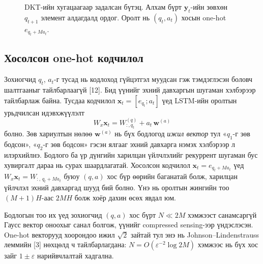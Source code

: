 \documentclass[10pt,twocolumn]{article}
\newcommand{\x}{\mathbf{x}}
\newcommand{\h}{\mathbf{h}}
\newcommand{\y}{\mathbf{y}}
\begin{document}
\begin{figure}[t]
\centering
{}
\caption{DKT-ийн хугацаагаар задалсан бүтэц. Алхам бүрт $\y_t$-ийн зөвхөн $q_{t+1}$
элемент алдагдалд ордог. Оролт нь $(q_t,a_t)$ хосын one-hot $e_{q_t+Ma_t}$.}
\label{fig:dkt}
\end{figure}

\subsection{Хосолсон one-hot кодчилол}
Зохиогчид $q_t$, $a_t$-г тусад нь кодлоход гүйцэтгэл муудсан гэж тэмдэглэсэн боловч шалтгааныг
тайлбарлаагүй [12]. Бид үүнийг эхний давхаргын шугаман хэлбэрээр тайлбарлаж байна. Тусдаа
кодчилол $\x_t=[e_{q_t};a_t]$ үед LSTM-ийн оролтын урьдчилсан идэвхжүүлэлт
\begin{equation}
W_x\x_t=W^{(q)}_{:,q_t}+a_t\,\mathbf w^{(a)}
\end{equation}
болно. Зөв хариултын нөлөө $\mathbf w^{(a)}$ нь бүх бодлогод \emph{ижил вектор} тул «$q_1$-г зөв
бодсон», «$q_2$-г зөв бодсон» гэсэн ялгааг эхний давхарга нэмэх хэлбэрээр л илэрхийлнэ. Бодлого
ба үр дүнгийн харилцан үйлчлэлийг рекуррент шугаман бус хувиргалт дараа нь сурах шаардлагатай.
Хосолсон кодчилол $\x_t=e_{q_t+Ma_t}$ үед $W_x\x_t=W_{:,\,q_t+Ma_t}$ буюу $(q,a)$ хос бүр
өөрийн баганатай болж, харилцан үйлчлэл эхний давхаргад шууд бий болно. Үнэ нь оролтын жингийн
тоо $(M{+}1)H$-аас $2MH$ болж хоёр дахин өсөх явдал юм.

Бодлогын тоо их үед зохиогчид $(q,a)$ хос бүрт $N\ll 2M$ хэмжээст санамсаргүй Гаусс вектор оноохыг
санал болгож, үүнийг compressed sensing-ээр үндэслэсэн. One-hot векторууд хоорондоо ижил
$\sqrt2$ зайтай тул энэ нь Johnson–Lindenstrauss леммийн [3] нөхцөлд ч тайлбарлагдана:
$N=O(\varepsilon^{-2}\log 2M)$ хэмжээс нь бүх хос зайг $1\pm\varepsilon$ нарийвчлалтай хадгална.
\end{document}
